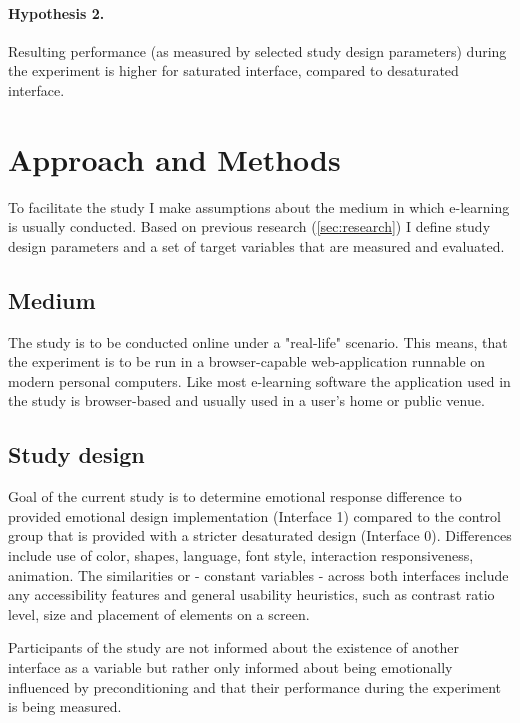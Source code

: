 		\paragraph{Hypothesis 2.} Resulting performance (as measured by selected study design parameters) during the experiment is higher for saturated interface, compared to desaturated interface.

\section{Approach and Methods}

To facilitate the study I make assumptions about the medium in which e-learning is usually conducted. Based on previous research (\ref{sec:research}) I define study design parameters and a set of target variables that are measured and evaluated.

	\subsection{Medium}
	
	The study is to be conducted online under a "real-life" scenario. This means, that the experiment is to be run in a browser-capable web-application runnable on modern personal computers. Like most e-learning software the  application used in the study is browser-based and usually used in a user's home or public venue.
	
	\subsection{Study design} \label{sec:study-design}
	
	Goal of the current study is to determine emotional response difference to provided emotional design implementation (Interface 1) compared to the control group that is provided with a stricter desaturated design (Interface 0). Differences include use of color, shapes, language, font style, interaction responsiveness, animation. The similarities or - constant variables - across both interfaces include any accessibility features and general usability heuristics, such as contrast ratio level, size and placement of elements on a screen.
	
	Participants of the study are not informed about the existence of another interface as a variable but rather only informed about being emotionally influenced by preconditioning and that their performance during the experiment is being measured.
	
